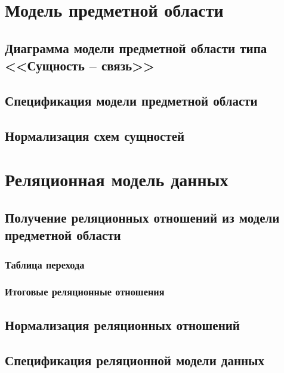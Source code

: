 \documentclass[10pt, a4paper, titlepage]{article}
\begin{document}
\section{Модель предметной области}

\subsection{Диаграмма модели предметной области типа <<Сущность -- связь>>}











\subsection{Спецификация модели предметной области}







\subsection{Нормализация схем сущностей}






\section{Реляционная модель данных}




\subsection{Получение реляционных отношений из модели предметной области}

\subsubsection{Таблица перехода}





\subsubsection{Итоговые реляционные отношения}




\subsection{Нормализация реляционных отношений}



\subsection{Спецификация реляционной модели данных}
\end{document}
